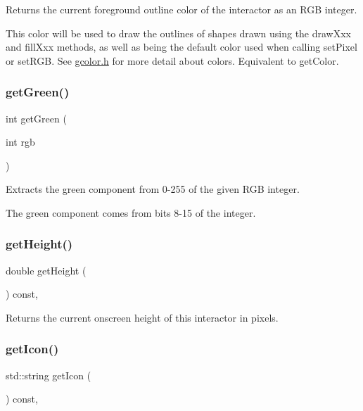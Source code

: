Returns the current foreground outline color of the interactor as an R\+GB integer. 

This color will be used to draw the outlines of shapes drawn using the draw\+Xxx and fill\+Xxx methods, as well as being the default color used when calling set\+Pixel or set\+R\+GB. See \mbox{\hyperlink{gcolor_8h_source}{gcolor.\+h}} for more detail about colors. Equivalent to get\+Color. \mbox{\label{classGCanvas_ac307c120ba81c4531d46924ba3358382}} 
\subsubsection{\texorpdfstring{get\+Green()}{getGreen()}}
{\footnotesize\ttfamily int get\+Green (\begin{DoxyParamCaption}\item[{int}]{rgb }\end{DoxyParamCaption})\hspace{0.3cm}{\ttfamily [static]}}



Extracts the green component from 0-\/255 of the given R\+GB integer. 

The green component comes from bits 8-\/15 of the integer. \mbox{\label{classGInteractor_a1e7e353362434072875264cf95629f99}} 
\subsubsection{\texorpdfstring{get\+Height()}{getHeight()}}
{\footnotesize\ttfamily double get\+Height (\begin{DoxyParamCaption}{ }\end{DoxyParamCaption}) const\hspace{0.3cm}{\ttfamily [virtual]}, {\ttfamily [inherited]}}



Returns the current onscreen height of this interactor in pixels. 

\mbox{\label{classGInteractor_aaed62a73004939a64da6f0eb9eb64d73}} 
\subsubsection{\texorpdfstring{get\+Icon()}{getIcon()}}
{\footnotesize\ttfamily std\+::string get\+Icon (\begin{DoxyParamCaption}{ }\end{DoxyParamCaption}) const\hspace{0.3cm}{\ttfamily [virtual]}, {\ttfamily [inherited]}}



